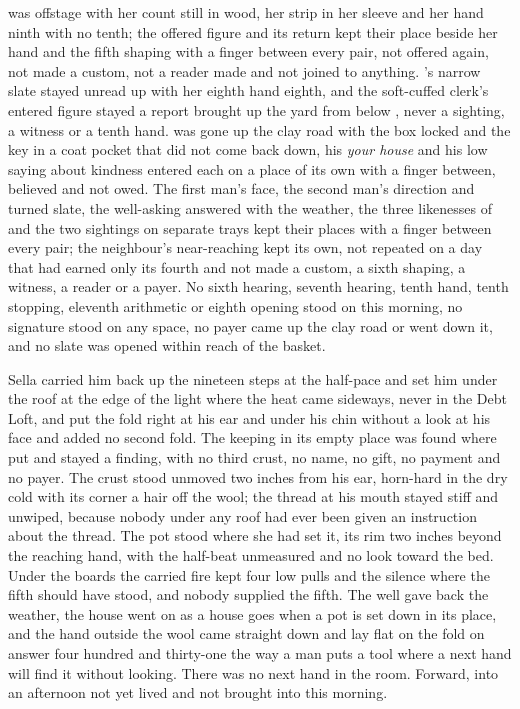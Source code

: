  was offstage with her count still in wood, her strip in her sleeve and her hand ninth with no tenth; the offered figure and its return kept their place beside her hand and the fifth shaping with a finger between every pair, not offered again, not made a custom, not a reader made and not joined to anything. 's narrow slate stayed unread up  with her eighth hand eighth, and the soft-cuffed clerk's entered figure stayed a report brought up the yard from  below , never a sighting, a witness or a tenth hand.  was gone up the clay road with the box locked and the key in a coat pocket that did not come back down, his \emph{your house} and his low saying about kindness entered each on a place of its own with a finger between, believed and not owed. The first man's face, the second man's direction and turned slate, the well-asking answered with the weather, the three likenesses of  and the two sightings on separate trays kept their places with a finger between every pair; the neighbour's near-reaching kept its own, not repeated on a day that had earned only its fourth and not made a custom, a sixth shaping, a witness, a reader or a payer. No sixth hearing, seventh hearing, tenth hand, tenth stopping, eleventh arithmetic or eighth opening stood on this morning, no signature stood on any space, no payer came up the clay road or went down it, and no slate was opened within reach of the basket.

Sella carried him back up the nineteen steps at the half-pace and set him under the roof at the edge of the light where the heat came sideways, never in the Debt Loft, and put the fold right at his ear and under his chin without a look at his face and added no second fold. The keeping in its empty place was found where put and stayed a finding, with no third crust, no name, no gift, no payment and no payer. The crust stood unmoved two inches from his ear, horn-hard in the dry cold with its corner a hair off the wool; the thread at his mouth stayed stiff and unwiped, because nobody under any roof had ever been given an instruction about the thread. The pot stood where she had set it, its rim two inches beyond the reaching hand, with the half-beat unmeasured and no look toward the bed. Under the boards the carried fire kept four low pulls and the silence where the fifth should have stood, and nobody supplied the fifth. The well gave back the weather, the house went on as a house goes when a pot is set down in its place, and the hand outside the wool came straight down and lay flat on the fold on answer four hundred and thirty-one the way a man puts a tool where a next hand will find it without looking. There was no next hand in the room. Forward, into an afternoon not yet lived and not brought into this morning.
